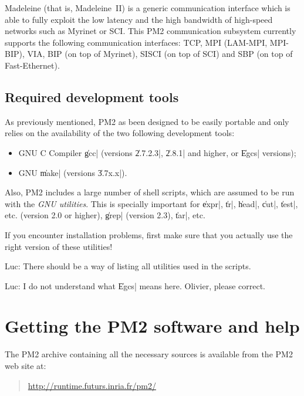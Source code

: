 Madeleine (that is, Madeleine~II) is a generic communication interface
which is able to fully exploit the low latency and the high bandwidth
of high-speed networks such as Myrinet or SCI. This PM2 communication
subsystem currently supports the following communication interfaces:
TCP, MPI (LAM-MPI, MPI-BIP), VIA, BIP (on top of Myrinet), SISCI (on
top of SCI) and SBP (on top of Fast-Ethernet).

\subsection{Required development tools}
\label{sec:tools}

As previously mentioned, PM2 as been designed to be easily portable
and only relies on the availability of the two following development
tools:
\begin{itemize}
  \small
\item GNU C Compiler \|gcc| (versions \|2.7.2.3|, \|2.8.1| and higher,
  or \|Egcs| versions);
\item GNU \|make| (versions \|3.7x.x|).
\end{itemize}
Also, PM2 includes a large number of shell scripts, which are assumed
to be run with the \emph{GNU utilities}. This is specially important
for \|expr|, \|tr|, \|head|, \|cut|, \|test|, etc. (version 2.0 or
higher), \|grep| (version 2.3), \|tar|, etc. 

\begin{warning}
  If you encounter installation problems, first make sure that you
  actually use the right version of these utilities!
\end{warning}
 
\begin{note}
  Luc: There should be a way of listing all utilities used in the
  scripts.
\end{note}

\begin{note}
  Luc: I do not understand what \|Egcs| means here. Olivier, please
  correct.
\end{note}

\section{Getting the PM2 software and help}

The PM2 archive containing all the necessary sources is available
from the PM2 web site at:
\begin{quote}
  \url{http://runtime.futurs.inria.fr/pm2/}
\end{quote}

